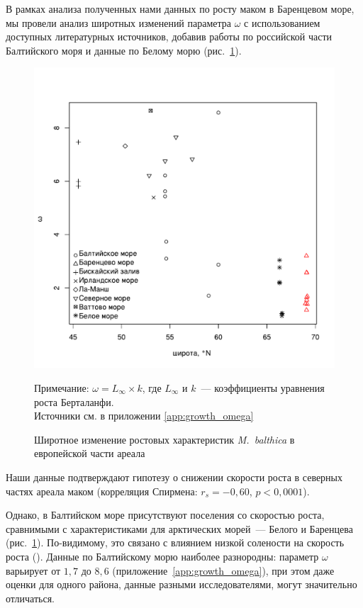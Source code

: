 В рамках анализа полученных нами данных по росту маком в Баренцевом море, мы провели анализ широтных изменений параметра $\omega$ с использованием доступных литературных источников, добавив работы по российской части Балтийского моря и данные по Белому морю (рис.~\ref{ris:omega_vs_lat}).
	\begin{figure}[p]
	\begin{center}	
		\includegraphics[width=\textwidth]{../Growth_sravnenie/long_vs_omega_ru.pdf}
	\end{center}
		\caption{Широтное изменение ростовых характеристик {\it M.~balthica} в европейской части ареала}

	\footnotesize{Примечание: $\omega = L_{\infty} \times k$, где $L_{\infty}$ и $k$~--- коэффициенты уравнения роста Берталанфи.\\ 
	Источники см. в приложении \ref{app:growth_omega}}
		\label{ris:omega_vs_lat}
	\end{figure}
Наши данные подтверждают гипотезу о снижении скорости роста в северных частях ареала маком (корреляция Спирмена: $r_{s} = -0,60$, $p < 0,0001$).

Однако, в Балтийском море присутствуют поселения со скоростью роста, сравнимыми с характеристиками для арктических морей~--- Белого и Баренцева (рис.~\ref{ris:omega_vs_lat}). 
По-видимому, это связано с влиянием низкой солености на скорость роста (\cite{Segerstrale_1960, Kube_et_al_1996}).
Данные по Балтийскому морю наиболее разнородны: параметр $\omega$ варьирует от $1,7$ до $8,6$ (приложение~\ref{app:growth_omega}), при этом даже оценки для одного района, данные разными исследователями, могут значительно отличаться.


